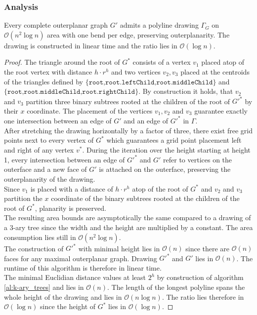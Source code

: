 \subsubsection{Analysis}

\begin{theorem}
	Every complete outerplanar graph $G'$ admits a polyline drawing $\Gamma_G$ on $\mathcal{O}(n^2 \log n)$ area with one bend per edge, preserving outerplanarity. The drawing is constructed in linear time and the ratio lies in $\mathcal{O}(\log n)$.
\end{theorem}

\begin{proof}
	The triangle around the root of $G^*$ consists of a vertex $v_1$ placed atop of the root vertex with distance $h\cdot r^h$ and two vertices $v_2,v_3$ placed at the centroids of the triangles defined by $\{\texttt{root,root.leftChild,root.middleChild}\}$ and $\{\texttt{root,root.middleChild,root.rightChild}\}$. By construction it holds, that $v_2$ and $v_3$ partition three binary subtrees rooted at the children of the root of $G'^*$ by their $x$ coordinate. The placement of the vertices $v_1,v_2$ and $v_3$ guarantee exactly one intersection between an edge of $G'$ and an edge of $G'^*$ in $\Gamma$.\\
	After stretching the drawing horizontally by a factor of three, there exist free grid points next to every vertex of $G^*$ which guarantees a grid point placement left and right of any vertex $v^*$. During the iteration over the height starting at height 1, every intersection between an edge of $G'^*$ and $G'$ refer to vertices on the outerface and a new face of $G'$ is attached on the outerface, preserving the outerplanarity of the drawing.\\
	Since $v_1$ is placed with a distance of $h\cdot r^h$ atop of the root of $G^*$ and $v_2$ and $v_3$ partition the $x$ coordinate of the binary subtrees rooted at the children of the root of $G^*$, planarity is preserved.\\
	The resulting area bounds are asymptotically the same compared to a drawing of a $3$-ary tree since the width and the height are multiplied by a constant. The area consumption lies still in $\mathcal{O}(n^2 \log n)$.\\
	The construction of $G'^*$ with minimal height lies in $\mathcal{O}(n)$ since there are $\mathcal{O}(n)$ faces for any maximal outerplanar graph. Drawing $G'^*$ and $G'$ lies in $\mathcal{O}(n)$. The runtime of this algorithm is therefore in linear time.\\
	The minimal Euclidian distance values at least $2^h$ by construction of algorithm \ref{al:k-ary_trees} and lies in $\mathcal{O}(n)$. The length of the longest polyline spans the whole height of the drawing and lies in $\mathcal{O}(n \log n)$. The ratio lies therefore in $\mathcal{O}(\log n)$ since the height of $G^*$ lies in $\mathcal{O}(\log n)$.
\end{proof}
